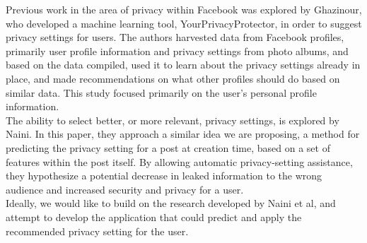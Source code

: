 \tab Previous work in the area of privacy within Facebook was explored by Ghazinour\cite{ghazinour2016yourprivacyprotector}, who developed a machine learning tool, YourPrivacyProtector, in order to suggest privacy settings for users. The authors harvested data from Facebook profiles, primarily user profile information and privacy settings from photo albums, and based on the data compiled, used it to learn about the privacy settings already in place, and made recommendations on what other profiles should do based on similar data. This study focused primarily on the user's personal profile information.
\\
\tab The ability to select better, or more relevant, privacy settings, is explored by Naini\cite{naini2015analyzing}. In this paper, they approach a similar idea we are proposing, a method for predicting the privacy setting for a post at creation time, based on a set of features within the post itself. By allowing automatic privacy-setting assistance, they hypothesize a potential decrease in leaked information to the wrong audience and increased security and privacy for a user.
\\
\tab Ideally, we would like to build on the research developed by Naini et al, and attempt to develop the application that could predict and apply the recommended privacy setting for the user. 
